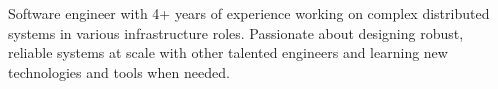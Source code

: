 
\begin{cvparagraph}
Software engineer with 4+ years of experience working on complex distributed systems in various infrastructure roles. Passionate about designing robust, reliable systems at scale with other talented engineers and learning new technologies and tools when needed.
\end{cvparagraph}
